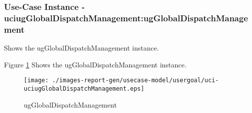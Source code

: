 
	\subsubsection{Use-Case Instance - uciugGlobalDispatchManagement:ugGlobalDispatchManagement}
	
	Shows the ugGlobalDispatchManagement instance.		  
	\begin{operationmodel}
	
	\end{operationmodel} 

	
	Figure \ref{fig:lu.uni.lassy.excalibur.group09.spec-RE-UC-uci-uciugGlobalDispatchManagement}
	Shows the ugGlobalDispatchManagement instance.
	
	\begin{figure}[htbp]
	\begin{center}
	
	\texttt{[image: ./images-report-gen/usecase-model/usergoal/uci-uciugGlobalDispatchManagement.eps]}
	\end{center}
	\caption[lu.uni.lassy.excalibur.group09.spec Sequence Diagram: uci-uciugGlobalDispatchManagement]{ugGlobalDispatchManagement}
	\label{fig:lu.uni.lassy.excalibur.group09.spec-RE-UC-uci-uciugGlobalDispatchManagement}
	\end{figure}
	\vspace{0.5cm}
